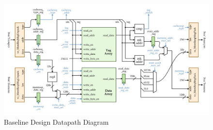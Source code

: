 \documentclass[10pt]{article}
\begin{document}

\begin{figure}[b]
\centering
\includegraphics[scale=0.6]{baseline}
\caption{Baseline Design Datapath Diagram}
\label{fig:baseline.jpg}
\end{figure}





\end{document}
